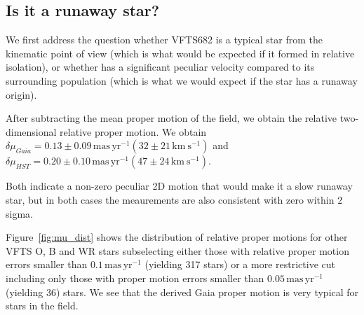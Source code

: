 \documentclass[apjl,twocolumn]{emulateapj}
\newcommand{\SdM}[1]{{{\color{brown}{#1}}}}
\newcommand{\kms}{{\,\mathrm{km\ s^{-1}}}}
\newcommand{\masyr}{\,\mathrm{mas}\,\mathrm{yr}^{-1}}
\DeclareRobustCommand{\Eqref}[1]{Eq.~\ref{#1}}
\begin{document}
\SdM{Since the errors for HST and Gaia are so similar and yield to different directions, I think we should probably restructure this paragraph.  I liked how you break down the story in two separate questions, but given Fig 1 I think it may not work well.  The first question should have adressed it in context of the motions of the other stars. And it has a very typical motion. I think that instead, you should simply describe Fig 1 step by step.  I think that will be stronger.  }

\subsection{Is it a runaway star?}
\label{sec:runaway}
We first address the question whether VFTS682 is a typical star
from the kinematic point of view (which is what would be expected if it formed in relative isolation), or whether has a significant peculiar velocity compared to its surrounding population (which is what we would expect if the star has a runaway origin).  

After subtracting the mean proper motion of the field, we obtain the relative two-dimensional relative proper motion. We obtain  $\delta \mu_{Gaia}=0.13\pm 0.09\masyr (32\pm 21\kms)$   and $\delta \mu_{HST}=0.20\pm 0.10\masyr (47 \pm 24\kms )$. 

Both indicate a non-zero peculiar 2D motion that would make it a slow runaway star, but in both cases the meaurements are also consistent with zero within 2 sigma. 

Figure~\ref{fig:mu_dist} shows the distribution of relative proper motions for other VFTS O, B and WR stars subselecting either those with relative proper motion errors smaller than $0.1\masyr$ (yielding 317 stars) or a more restrictive cut including only those with proper motion errors smaller than $0.05\masyr$ (yielding 36) stars.   We see that the derived Gaia proper motion is very typical for stars in the field. 

\SdM{XXX We need to rethink }


\end{document}
